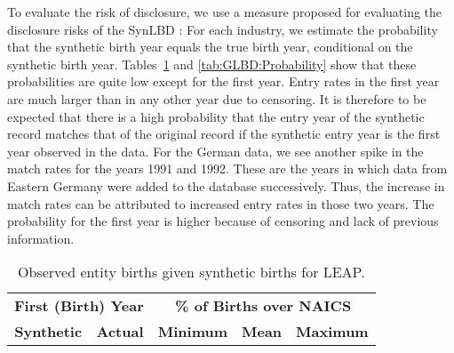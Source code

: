 
To evaluate the risk of disclosure, we use a measure proposed for evaluating the disclosure risks of the SynLBD \citep{KinneyEtAl2011}: For each industry, we estimate the probability that the synthetic birth year equals the true birth year, conditional on the synthetic birth year. Tables~\ref{tab:Can:ProbabilityPrivate} and \ref{tab:GLBD:Probability} show that these probabilities are quite low except for the first year. Entry rates in the first year are much larger than in any other year due to censoring. It is therefore to be expected that there is a high probability that the entry year of the synthetic record matches that of the original record if the synthetic entry year is the first year observed in the data. For the German data, we see another spike in the match rates for the years 1991 and 1992. These are the years in which data from Eastern Germany were added to the database successively. Thus, the increase in match rates can be attributed to increased entry rates in those two years. 
The probability for the first year is higher because of censoring and lack of previous information.

\begin{table}[H]
\centering\footnotesize
\caption{Observed entity births given synthetic births for LEAP.} \label{tab:Can:ProbabilityPrivate} \medskip
\renewcommand{\arraystretch}{1}
\begin{tabular}{c c| c c c}
\toprule
\multicolumn{2}{c|}{\textbf{First (Birth) Year}} &  \multicolumn{3}{c}{\textbf{\% of Births over NAICS}}\\
\textbf{Synthetic}&\textbf{Actual}&\textbf{Minimum}&\textbf{Mean}&\textbf{Maximum}\\
\midrule

\bottomrule
\end{tabular} 
\\
\justify
\end{table}

%

